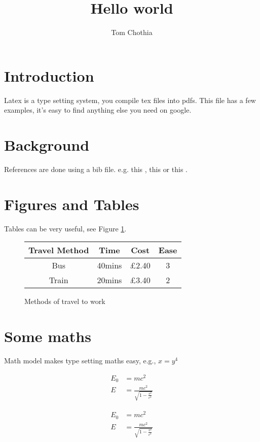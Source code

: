 \documentclass[12pt]{article}
\begin{document}
\title{Hello world}
\author{Tom Chothia}

\maketitle



\section{Introduction}

Latex is a type setting system, you compile tex files into pdfs. This file has a few examples, it's easy to find anything else you need on google.

\section{ Background}
References are done using a bib file. e.g. this \cite{bhargavan2016practical}, this \cite{bantin2010} or this \cite{brualdi2010introductory}.


\section{Figures and Tables}

Tables can be very useful, see Figure \ref{fig:travel}.

\begin{figure}[t]
\begin{center}
\begin{tabular}{c | c | c |  c}
Travel Method & Time & Cost & Ease \\
\hline
Bus & 40mins & \pounds 2.40 & 3 \\
Train & 20mins & \pounds 3.40 & 2 \\
\end{tabular}
\end{center}
\caption{Methods of travel to work}
\label{fig:travel}
\end{figure}

\section{Some maths}

Math model makes type setting maths easy, e.g., $x = y^4$

  \begin{align}
    E_0 &= mc^2 \\
    E &= \frac{mc^2}{\sqrt{1-\frac{v^2}{c^2}}}
  \end{align}  
  
  \begin{align}
	E_0 &= mc^2 \\
	E &= \frac{mc^2}{\sqrt{1-\frac{v^2}{c^2}}}
  \end{align}

  
  


  
\end{document}
